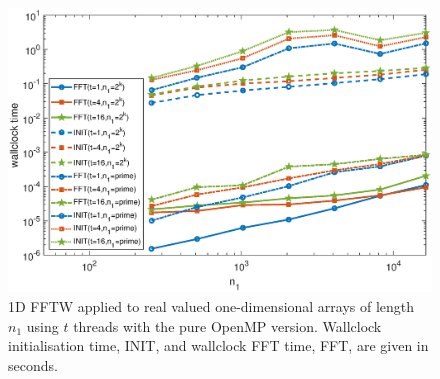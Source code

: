 \documentclass[a4]{article}
\begin{document}
\begin{figure}[!htbp]
\begin{center}
 \includegraphics[width=.9\textwidth, height=0.42\textheight]{FFTW1D_OMP_threads_times_fig.eps}
\caption{1D FFTW applied to real valued one-dimensional arrays of length $n_1$ using $t$ threads with the pure OpenMP version. Wallclock initialisation time, INIT, and wallclock FFT time, FFT, are given in seconds.}
\label{Fig:fftw1d_omp_threads_times}
\end{center}
\end{figure}
\end{document}
